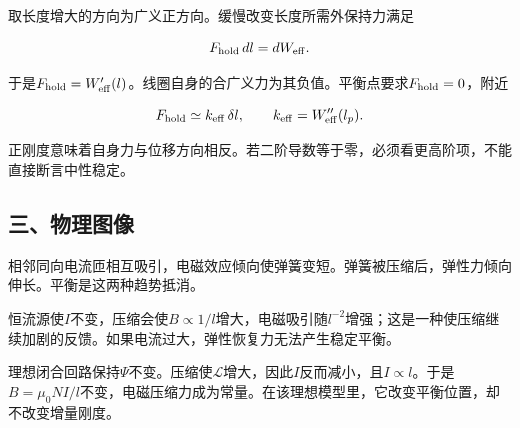 \documentclass[12pt,a4paper,fontset=fandol]{ctexart}
\begin{document}
取长度增大的方向为广义正方向。缓慢改变长度所需外保持力满足

\[
F_{\rm hold}\,dl=dW_{\rm eff}.
\]

于是\(F_{\rm hold}=W'_{\rm eff}(l)\)。线圈自身的合广义力为其负值。平衡点要求\(F_{\rm hold}=0\)，附近

\[
F_{\rm hold}\simeq k_{\rm eff}\,\delta l,
\qquad k_{\rm eff}=W''_{\rm eff}(l_p).
\]

正刚度意味着自身力与位移方向相反。若二阶导数等于零，必须看更高阶项，不能直接断言中性稳定。

\subsection{三、物理图像}\label{ux4e09ux7269ux7406ux56feux50cf-1}

相邻同向电流匝相互吸引，电磁效应倾向使弹簧变短。弹簧被压缩后，弹性力倾向伸长。平衡是这两种趋势抵消。

恒流源使\(I\)不变，压缩会使\(B\propto1/l\)增大，电磁吸引随\(l^{-2}\)增强；这是一种使压缩继续加剧的反馈。如果电流过大，弹性恢复力无法产生稳定平衡。

理想闭合回路保持\(\Psi\)不变。压缩使\(\mathcal L\)增大，因此\(I\)反而减小，且\(I\propto l\)。于是\(B=\mu_0NI/l\)不变，电磁压缩力成为常量。在该理想模型里，它改变平衡位置，却不改变增量刚度。

\begin{center}
\begin{minipage}{\linewidth}
\centering\begingroup{}
\ifdim\wd\diagrambox>.88\linewidth
\sbox{\diagrambox}{\resizebox{.88\linewidth}{!}{\usebox{\diagrambox}}}\fi
\ifdim\ht\diagrambox>.38\textheight
\resizebox{!}{.38\textheight}{\usebox{\diagrambox}}
\else\usebox{\diagrambox}\fi
\par{}\endgroup\end{minipage}\end{center}
\end{document}

